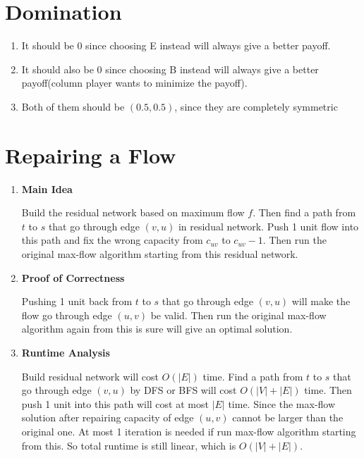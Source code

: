 \documentclass[11pt]{article}
\newenvironment{qparts}{\begin{enumerate}[{(}a{)}]}{\end{enumerate}}
\begin{document}
\newpage
\section{Domination}
\begin{qparts}
	\item 
	
	It should be 0 since choosing E instead will always give a better payoff.
	
	\item
	
	It should also be 0 since choosing B instead will always give a better payoff(column player wants to minimize the payoff).
	
	\item
	
	Both of them should be $(0.5, 0.5)$, since they are completely symmetric
	
\end{qparts}




\newpage
\section{Repairing a Flow}
\begin{qparts}
	\item \textbf{Main Idea}
	
	Build the residual network based on maximum flow $f$. Then find a path from $t$ to $s$ that go through edge $(v, u)$ in residual network. Push 1 unit flow into this path and fix the wrong capacity from $c_{uv}$ to $c_{uv} - 1$. Then run the original max-flow algorithm starting from this residual network.

	\item \textbf{Proof of Correctness}
	
	Pushing 1 unit back from $t$ to $s$ that go through edge $(v, u)$ will make the flow go through edge $(u, v)$ be valid. Then run the original max-flow algorithm again from this is sure will give an optimal solution.
	
	\item \textbf{Runtime Analysis}
	
	Build residual network will cost $O(|E|)$ time. Find a path from $t$ to $s$ that go through edge $(v, u)$ by DFS or BFS will cost $O(|V| + |E|)$ time. Then push 1 unit into this path will cost at most $|E|$ time. Since the max-flow solution after repairing capacity of edge $(u, v)$ cannot be larger than the original one. At most 1 iteration is needed if run max-flow algorithm starting from this. So total runtime is still linear, which is $O(|V| + |E|)$.

\end{qparts}
\end{document}
